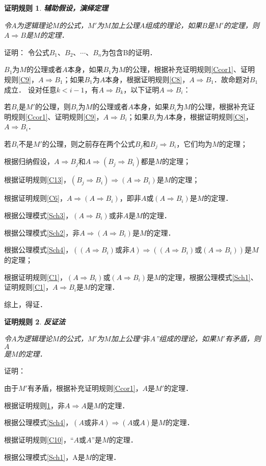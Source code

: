 \documentclass[12pt, a4paper, oneside]{book}
\newtheorem{C}{证明规则}
\begin{document}
			\begin{C}\label{C14}
				\textbf{辅助假设，演绎定理}
				\par	
				令$A$为逻辑理论$M$的公式，$M'$为$M$加上公理$A$组成的理论，如果$B$是$M'$的定理，则$A\Rightarrow B$是$M$的定理．
			\end{C}
			证明：
			令公式$B_1$、$B_2$、$\cdots$、$B_n$为包含B的证明．
			\par
			$B_1$为$M$的公理或者$A$本身，如果$B_1$为$M$的公理，根据补充证明规则\ref{Ccor1}、证明规则\ref{C9}，$A\Rightarrow B_1$；如果$B_1$为$A$本身，根据证明规则\ref{C8}，$A\Rightarrow B_1$．故命题对$B_1$成立．
			设对任意$k<i-1$，有$A\Rightarrow B_k$，以下证明$A\Rightarrow B_i$：
			\par
			若$B_i$是$M'$的公理，则$B_i$为$M$的公理或者$A$本身，如果$B_i$为$M$的公理，根据补充证明规则\ref{Ccor1}、证明规则\ref{C9}，$A\Rightarrow B_i$；如果$B_i$为$A$本身，根据证明规则\ref{C8}，$A\Rightarrow B_i$．
			\par
			若$B_i$不是$M'$的公理，则之前存在两个公式$B_j$和$B_j\Rightarrow B_i$，它们均为$M$的定理；
			\par
			根据归纳假设，$A\Rightarrow B_j$和$A\Rightarrow (B_j\Rightarrow B_i)$都是$M$的定理；
			\par
			根据证明规则\ref{C13}，$(B_j\Rightarrow B_i)\Rightarrow (A\Rightarrow B_i)$是$M$的定理；
			\par
			根据证明规则\ref{C6}，$A\Rightarrow (A\Rightarrow B_i)$，即$\text{非}A\text{或}(A\Rightarrow B_i)$是$M$的定理．
			\par
			根据公理模式\ref{Sch3}，$(A\Rightarrow B_i)\text{或}\text{非}A$是$M$的定理．
			\par
			根据公理模式\ref{Sch2}，$\text{非}A\Rightarrow (A\Rightarrow B_i)$是$M$的定理．
			\par
			根据公理模式\ref{Sch4}，$((A\Rightarrow B_i)\text{或}\text{非}A)\Rightarrow((A\Rightarrow B_i)\text{或}(A\Rightarrow B_i))$是$M$的定理；
			\par
			根据证明规则\ref{C1}，$(A\Rightarrow B_i)\text{或}(A\Rightarrow B_i)$是$M$的定理，根据公理模式\ref{Sch1}、证明规则\ref{C1}，$A\Rightarrow B_i$是$M$的定理．
			\par
			综上，得证．
			
			\begin{C}\label{C15}
				\textbf{反证法}
				\par
				令$A$为逻辑理论$M$的公式，$M'$为$M$加上公理“$\text{非}A$”组成的理论，如果$M'$有矛盾，则$A$\\是$M$的定理．
			\end{C}
			证明：
			\par
			由于$M'$有矛盾，根据补充证明规则\ref{Ccor1}，$A$是$M'$的定理．
			\par
			根据证明规则\ref{C14}，$\text{非}A\Rightarrow A$是$M$的定理．
			\par
			根据公理模式\ref{Sch4}，$(A\text{或}\text{非}A)\Rightarrow (A\text{或}A)$是$M$的定理．
			\par
			根据证明规则\ref{C10}，“$A\text{或}A$”是$M$的定理．
			\par
			根据公理模式\ref{Sch1}，A是$M$的定理．
			
\end{document}
